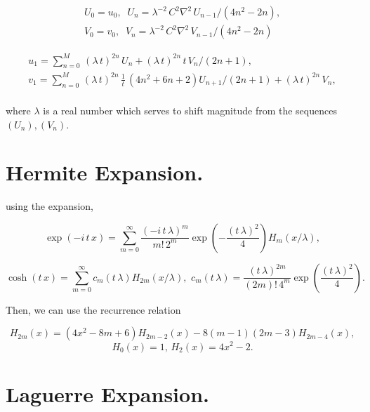 \documentclass[amsmath,amssymb,floatfix]{revtex4}
\numberwithin{equation}{section}
\begin{document}
\begin{eqnarray}
	 U_0 = u_0, \; \; U_n = \lambda^{-2} \, C^2\nabla^2 \, U_{n-1} / {(4n^2-2n)},\\
  	 V_0 = v_0, \; \; V_n = \lambda^{-2} \, C^2\nabla^2 \, V_{n-1} / {(4n^2-2n)}
\end{eqnarray}

\begin{eqnarray}
	 u_1 = \sum_{n=0}^M \, (\lambda \, t)^{2n} \, U_n +  (\lambda \, t)^{2n} \, t \, V_n/(2n+1),\\
	 v_1 = \sum_{n=0}^M \, (\lambda \, t)^{2n} \, \frac{1}{t} \, (4n^2+6n+2)U_{n+1}/(2n+1) + (\lambda \, t)^{2n} \, V_n,\\	 
\end{eqnarray}

where $\lambda$ is a real number which serves to shift magnitude from the sequences $(U_n), (V_n)$.

\section{\label{sec:level3}Hermite Expansion.\protect}

\noindent using the expansion, 


\begin{equation}
	\exp{(-i \, t \, x)} = \sum_{m=0}^{\infty} \frac{(-i \, t \, \lambda)^{m}}{m! \, 2^{m}} \exp{\left(-\frac{( t \, \lambda  )^2}{4}\right)} H_m(x/\lambda),
\end{equation}

\begin{equation}
	\cosh{( t \, x)} = \sum_{m=0}^{\infty} c_m(t \, \lambda) H_{2m}(x/\lambda), \, \, c_m(t \, \lambda) =  \frac{(t \, \lambda)^{2m}}{(2m)! \, 4^{m}} \exp{\left(\frac{(t \, \lambda )^2}{4}\right)} .
\end{equation}

Then, we can use the recurrence relation


\begin{equation}
	H_{2m}(x) = (4x^2 -8m+6)H_{2m-2}(x)-8(m-1)(2m-3)H_{2m-4}(x),
\end{equation}
\begin{equation}
	 H_{0}(x) = 1, \, H_{2}(x) = 4x^2-2. \nonumber
\end{equation}



\section{\label{sec:level3}Laguerre Expansion.\protect}
\end{document}
